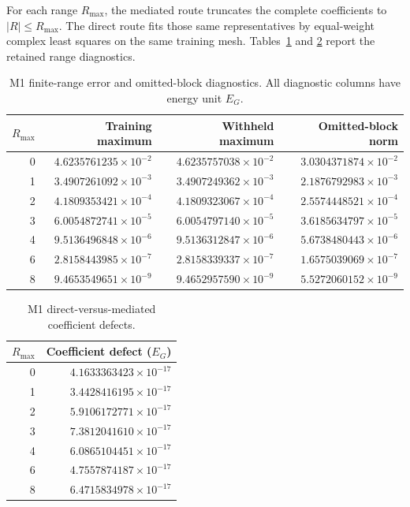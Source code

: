For each range $R_{\max}$, the mediated route truncates the complete
coefficients to $|R|\leq R_{\max}$. The direct route fits those same
representatives by equal-weight complex least squares on the same training
mesh. Tables~\ref{tab:supp-m1-ranges} and
\ref{tab:supp-m1-route-defects} report the retained range diagnostics.

\begin{table}[ht]
\centering
\small
\caption{M1 finite-range error and omitted-block diagnostics. All diagnostic
columns have energy unit $E_G$.}
\label{tab:supp-m1-ranges}
\begin{tabular}{@{}rrrr@{}}
\toprule
$R_{\max}$ & Training maximum & Withheld maximum & Omitted-block norm \\
\midrule
0 & $4.6235761235\times10^{-2}$ & $4.6235757038\times10^{-2}$ & $3.0304371874\times10^{-2}$ \\
1 & $3.4907261092\times10^{-3}$ & $3.4907249362\times10^{-3}$ & $2.1876792983\times10^{-3}$ \\
2 & $4.1809353421\times10^{-4}$ & $4.1809323067\times10^{-4}$ & $2.5574448521\times10^{-4}$ \\
3 & $6.0054872741\times10^{-5}$ & $6.0054797140\times10^{-5}$ & $3.6185634797\times10^{-5}$ \\
4 & $9.5136496848\times10^{-6}$ & $9.5136312847\times10^{-6}$ & $5.6738480443\times10^{-6}$ \\
6 & $2.8158443985\times10^{-7}$ & $2.8158339337\times10^{-7}$ & $1.6575039069\times10^{-7}$ \\
8 & $9.4653549651\times10^{-9}$ & $9.4652957590\times10^{-9}$ & $5.5272060152\times10^{-9}$ \\
\bottomrule
\end{tabular}
\end{table}

\begin{table}[ht]
\centering
\caption{M1 direct-versus-mediated coefficient defects.}
\label{tab:supp-m1-route-defects}
\begin{tabular}{@{}rr@{}}
\toprule
$R_{\max}$ & Coefficient defect ($E_G$) \\
\midrule
0 & $4.1633363423\times10^{-17}$ \\
1 & $3.4428416195\times10^{-17}$ \\
2 & $5.9106172771\times10^{-17}$ \\
3 & $7.3812041610\times10^{-17}$ \\
4 & $6.0865104451\times10^{-17}$ \\
6 & $4.7557874187\times10^{-17}$ \\
8 & $6.4715834978\times10^{-17}$ \\
\bottomrule
\end{tabular}
\end{table}

